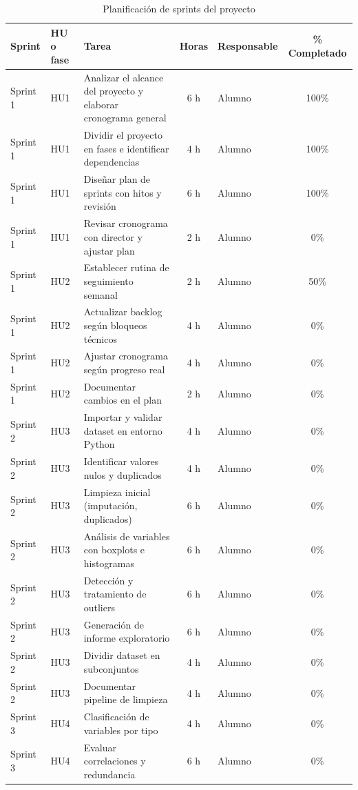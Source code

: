\documentclass[
11pt, %
]{charter}
\begin{document}
\begin{table}[htpb]
\centering
\caption{Planificación de sprints del proyecto}
\begin{tabularx}{\linewidth}{@{}|l|l|X|c|l|c|@{}}
\hline
\rowcolor[HTML]{C0C0C0}
Sprint & HU o fase & Tarea & Horas & Responsable & \% Completado \\ \hline

Sprint 1 & HU1 & Analizar el alcance del proyecto y elaborar cronograma general & 6 h & Alumno & 100\% \\ \hline
Sprint 1 & HU1 & Dividir el proyecto en fases e identificar dependencias & 4 h & Alumno & 100\% \\ \hline
Sprint 1 & HU1 & Diseñar plan de sprints con hitos y revisión & 6 h & Alumno & 100\% \\ \hline
Sprint 1 & HU1 & Revisar cronograma con director y ajustar plan & 2 h & Alumno & 0\% \\ \hline
Sprint 1 & HU2 & Establecer rutina de seguimiento semanal & 2 h & Alumno & 50\% \\ \hline
Sprint 1 & HU2 & Actualizar backlog según bloqueos técnicos & 4 h & Alumno & 0\% \\ \hline
Sprint 1 & HU2 & Ajustar cronograma según progreso real & 4 h & Alumno & 0\% \\ \hline
Sprint 1 & HU2 & Documentar cambios en el plan & 2 h & Alumno & 0\% \\ \hline

Sprint 2 & HU3 & Importar y validar dataset en entorno Python & 4 h & Alumno & 0\% \\ \hline
Sprint 2 & HU3 & Identificar valores nulos y duplicados & 4 h & Alumno & 0\% \\ \hline
Sprint 2 & HU3 & Limpieza inicial (imputación, duplicados) & 6 h & Alumno & 0\% \\ \hline
Sprint 2 & HU3 & Análisis de variables con boxplots e histogramas & 6 h & Alumno & 0\% \\ \hline
Sprint 2 & HU3 & Detección y tratamiento de outliers & 6 h & Alumno & 0\% \\ \hline
Sprint 2 & HU3 & Generación de informe exploratorio & 6 h & Alumno & 0\% \\ \hline
Sprint 2 & HU3 & Dividir dataset en subconjuntos & 4 h & Alumno & 0\% \\ \hline
Sprint 2 & HU3 & Documentar pipeline de limpieza & 4 h & Alumno & 0\% \\ \hline

Sprint 3 & HU4 & Clasificación de variables por tipo & 4 h & Alumno & 0\% \\ \hline
Sprint 3 & HU4 & Evaluar correlaciones y redundancia & 6 h & Alumno & 0\% \\ \hline

\end{tabularx}
\end{table}
\end{document}
